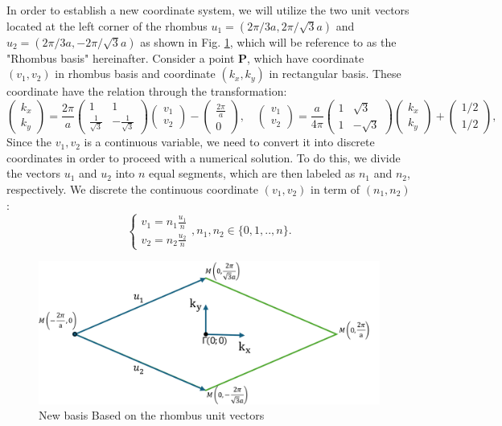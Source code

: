 \documentclass[12pt,english,a4paper]{article}
\begin{document}
\quad In order to establish a new coordinate system, we will utilize the two unit vectors located at the left corner of the rhombus $u_1 = (2\pi/3a,2\pi/\sqrt{3}a)$ and $u_2 = (2\pi/3a,-2\pi/\sqrt{3}a)$ as shown in Fig. \ref{rhombuskgrid}, which will be reference to as the "Rhombus basis" hereinafter. Consider a point $\textbf{P}$, which have coordinate $(v_1, v_2)$ in rhombus basis and coordinate $(k_x,k_y)$ in rectangular basis. These coordinate have the relation through the transformation:
\begin{equation}
	\begin{pmatrix} k_x \\ k_y \end{pmatrix}
	= \frac{2\pi}{a} \begin{pmatrix}
		1 & 1\\ \frac{1}{\sqrt{3}} & -\frac{1}{\sqrt{3}}\end{pmatrix} \begin{pmatrix} v_1 \\v_2\end{pmatrix} - \begin{pmatrix} \frac{2\pi}{a} \\ 0\end{pmatrix},\quad  \begin{pmatrix} v_1 \\v_2\end{pmatrix}
		= \frac{a}{4\pi} \begin{pmatrix}
		1 & \sqrt{3}\\1 & -\sqrt{3}\end{pmatrix}\begin{pmatrix} k_x \\ k_y \end{pmatrix}  + \begin{pmatrix} 1/2 \\ 1/2\end{pmatrix}, 
\end{equation}
\quad Since the $v_1,v_2$ is a continuous variable, we need to convert it into discrete coordinates in order to proceed with a numerical solution. To do this, we divide the vectors $u_1$ and $u_2$ into $n$ equal segments, which are then labeled as $n_{1}$ and $n_{2}$, respectively. We discrete the continuous coordinate $(v_1,v_2)$ in term of $(n_{1},n_{2})$:
$$\begin{cases}
v_1 = n_{1} \frac{u_1}{n}\\
v_2 = n_{2} \frac{u_2}{n}
\end{cases}, n_1, n_2 \in \{0,1,..,n\}.$$
\begin{figure}
	\begin{center}
		\includegraphics[width=0.5\linewidth]{Images/rhombuskgrid.pdf}
		\caption{New basis Based on the rhombus unit vectors}
		\label{rhombuskgrid}
	\end{center}
\end{figure}
\end{document}
